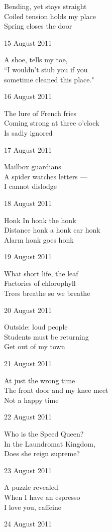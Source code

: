 \documentclass[12pt]{article}
\begin{document}
Bending, yet stays straight \\
Coiled tension holds my place \\
Spring closes the door

15 August 2011

A shoe, tells my toe, \\
``I wouldn't stub you if you \\
sometime cleaned this place."

16 August 2011

The lure of French fries \\
Coming strong at three o'clock \\
Is sadly ignored

17 August 2011

Mailbox guardians \\
A spider watches letters --- \\
I cannot dislodge


\newpage

18 August 2011

Honk In honk the honk \\
Distance honk a honk car honk \\
Alarm honk goes honk

19 August 2011

What short life, the leaf \\
Factories of chlorophyll \\
Trees breathe so we breathe

20 August 2011

Outside: loud people \\
Students must be returning \\
Get out of my town

21 August 2011

At just the wrong time \\
The front door and my knee meet \\
Not a happy time

22 August 2011

Who is the Speed Queen? \\
In the Laundromat Kingdom, \\
Does she reign supreme?

23 August 2011

A puzzle revealed \\
When I have an espresso \\
I love you, caffeine

24 August 2011
\end{document}
